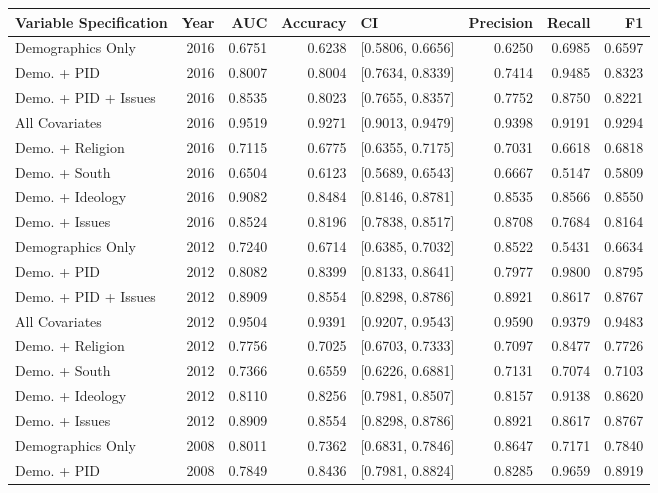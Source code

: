 \begin{longtable}{lrrrlrrr}
  \toprule
Variable Specification & Year & AUC & Accuracy & CI & Precision & Recall & F1 \\ 
  \midrule
Demographics Only & 2016 & 0.6751 & 0.6238 & [0.5806, 0.6656] & 0.6250 & 0.6985 & 0.6597 \\ 
  Demo. + PID & 2016 & 0.8007 & 0.8004 & [0.7634, 0.8339] & 0.7414 & 0.9485 & 0.8323 \\ 
  Demo. + PID + Issues & 2016 & 0.8535 & 0.8023 & [0.7655, 0.8357] & 0.7752 & 0.8750 & 0.8221 \\ 
  All Covariates & 2016 & 0.9519 & 0.9271 & [0.9013, 0.9479] & 0.9398 & 0.9191 & 0.9294 \\ 
  Demo. + Religion & 2016 & 0.7115 & 0.6775 & [0.6355, 0.7175] & 0.7031 & 0.6618 & 0.6818 \\ 
  Demo. + South & 2016 & 0.6504 & 0.6123 & [0.5689, 0.6543] & 0.6667 & 0.5147 & 0.5809 \\ 
  Demo. + Ideology & 2016 & 0.9082 & 0.8484 & [0.8146, 0.8781] & 0.8535 & 0.8566 & 0.8550 \\ 
  Demo. + Issues & 2016 & 0.8524 & 0.8196 & [0.7838, 0.8517] & 0.8708 & 0.7684 & 0.8164 \\ 
  Demographics Only & 2012 & 0.7240 & 0.6714 & [0.6385, 0.7032] & 0.8522 & 0.5431 & 0.6634 \\ 
  Demo. + PID & 2012 & 0.8082 & 0.8399 & [0.8133, 0.8641] & 0.7977 & 0.9800 & 0.8795 \\ 
  Demo. + PID + Issues & 2012 & 0.8909 & 0.8554 & [0.8298, 0.8786] & 0.8921 & 0.8617 & 0.8767 \\ 
  All Covariates & 2012 & 0.9504 & 0.9391 & [0.9207, 0.9543] & 0.9590 & 0.9379 & 0.9483 \\ 
  Demo. + Religion & 2012 & 0.7756 & 0.7025 & [0.6703, 0.7333] & 0.7097 & 0.8477 & 0.7726 \\ 
  Demo. + South & 2012 & 0.7366 & 0.6559 & [0.6226, 0.6881] & 0.7131 & 0.7074 & 0.7103 \\ 
  Demo. + Ideology & 2012 & 0.8110 & 0.8256 & [0.7981, 0.8507] & 0.8157 & 0.9138 & 0.8620 \\ 
  Demo. + Issues & 2012 & 0.8909 & 0.8554 & [0.8298, 0.8786] & 0.8921 & 0.8617 & 0.8767 \\ 
  Demographics Only & 2008 & 0.8011 & 0.7362 & [0.6831, 0.7846] & 0.8647 & 0.7171 & 0.7840 \\ 
  Demo. + PID & 2008 & 0.7849 & 0.8436 & [0.7981, 0.8824] & 0.8285 & 0.9659 & 0.8919 \\ 

\end{longtable}
